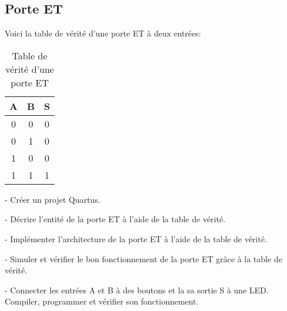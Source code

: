\subsection{Porte ET}
Voici la table de vérité d'une porte ET à deux entrées:
\begin{table}[ht]
    \centering
    \begin{tabular}{c c|c} 
        A & B & S \\
        \hline
        0 & 0 & 0 \\
        0 & 1 & 0 \\
        1 & 0 & 0 \\
        1 & 1 & 1
    \end{tabular}
    \caption{Table de vérité d'une porte ET}
\end{table}

- Créer un projet Quartus.

\medskip

- Décrire l'entité de la porte ET à l'aide de la table de vérité.

\medskip

- Implémenter l'architecture de la porte ET à l'aide de la table de vérité.

\medskip

- Simuler et vérifier le bon fonctionnement de la porte ET grâce à la table de vérité.

\medskip

- Connecter les entrées A et B à des boutons et la sa sortie S à une LED. Compiler, programmer et vérifier son fonctionnement.
